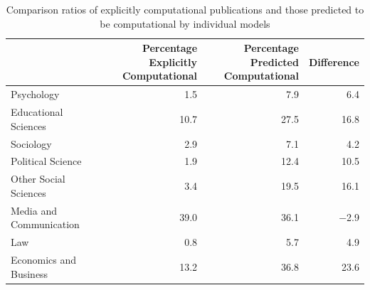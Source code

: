 \documentclass[12pt, a4paper]{article}
\begin{document}
\begin{table}[H]
	\centering
	\begin{adjustbox}{center}
		\begin{tabular}{lrrr}
			\toprule
			{} &  \pbox{20cm}{Percentage\\Explicitly Computational} &  \pbox{20cm}{Percentage\\Predicted Computational} &  Difference \\
			\midrule
			Psychology              &          \num{1.5} &          \num{7.9} &  \num{6.4} \\
			Educational Sciences    &         \num{10.7} &         \num{27.5} & \num{16.8} \\
			Sociology               &          \num{2.9} &          \num{7.1} &  \num{4.2} \\
			Political Science       &          \num{1.9} &         \num{12.4} & \num{10.5} \\
			Other Social Sciences   &          \num{3.4} &         \num{19.5} & \num{16.1} \\
			Media and Communication &         \num{39.0} &         \num{36.1} &  \num{-2.9} \\
			Law                     &          \num{0.8} &          \num{5.7} &  \num{4.9} \\
			Economics and Business  &         \num{13.2} &         \num{36.8} & \num{23.6} \\
			\bottomrule
		\end{tabular}
	\end{adjustbox}
	\caption{Comparison ratios of  explicitly computational publications and those predicted to be computational by individual models}\label{ret_sub}
\end{table}
\end{document}

